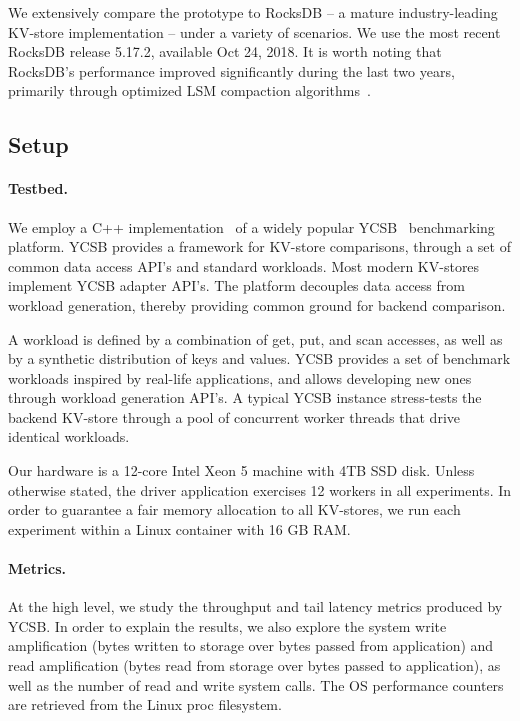 We extensively compare the \sys\/ prototype to RocksDB -- a mature industry-leading KV-store implementation  -- under a variety of scenarios.  We use the most recent RocksDB release 5.17.2, available Oct 24, 2018.  
It is worth noting that RocksDB's performance improved significantly during the last two years, primarily through 
optimized LSM compaction algorithms~\cite{CallaghanCompaction}.   

\subsection{Setup}

\paragraph{Testbed.} We employ a C++ implementation~\cite{Cpp-YCSB} of a widely popular 
YCSB~\cite{YCSB} benchmarking platform. 
YCSB provides a framework for KV-store comparisons, through a set of common data access API's and standard workloads. 
Most modern KV-stores implement  YCSB adapter API's. The platform decouples data access from workload generation, 
thereby providing common ground for backend comparison. 

A workload is defined by a combination of get, put, and scan accesses, as well as by a synthetic distribution of keys and values. 
YCSB provides a set of benchmark workloads inspired by real-life applications, and allows developing new ones through workload 
generation API's. A typical YCSB instance stress-tests the backend KV-store through a pool of concurrent worker threads that drive identical
workloads. %

Our hardware is a 12-core Intel Xeon 5 machine with 4TB SSD disk. Unless otherwise stated, the driver application 
exercises 12 workers in all experiments. In order to guarantee a fair memory allocation to all KV-stores, we run each 
experiment within a Linux container with 16 GB RAM. 

\paragraph{Metrics.} At the high level, we study the throughput and tail latency metrics produced by YCSB. 
In order to explain the results, we also explore the system write amplification (bytes written to storage over 
bytes passed from application) and read amplification (bytes read from storage over bytes passed to application), 
as well as the number of read and write system calls. The OS performance counters are retrieved from the Linux
proc filesystem. 

